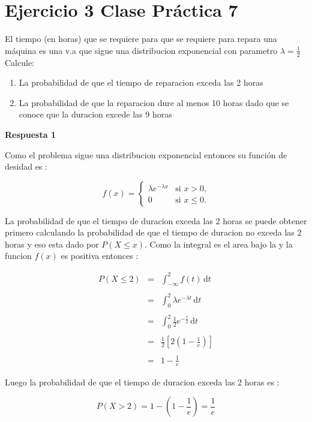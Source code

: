 \documentclass{article}
\begin{document}
            




    \section*{Ejercicio 3 Clase Pr\'actica 7}

    El tiempo (en horas) que se requiere para que se requiere para repara una m\'aquina es una v.a 
    que sigue una distribucion exponencial con parametro $ \lambda = \frac{1}{2} $ Calcule: 
    \begin{enumerate}
        \item La probabilidad de que el tiempo de reparacion exceda las 2 horas 
        \item La probabilidad de que la reparacion dure al menos 10 horas dado que se conoce que
         la duracion excede las 9 horas 
    \end{enumerate} 
    
    {\bf Respuesta 1 } 

    Como el problema sigue una distribucion exponencial entonces su funci\'on de desidad es : 

    
    \begin{equation*}
        f(x)=\begin{cases}
            \lambda e^{-\lambda x }  & \mbox{si $x>0$,}
            \\
            0                        & \mbox{si $x\le 0$.}
            \end{cases}
    \end{equation*}

    La probabilidad de que el tiempo de duracion exceda las 2 horas se 
    puede obtener primero calculando la probabilidad de que el tiempo de 
    duracion no exceda las 2 horas  y eso esta dado por $P \left(X \le x\right)$. 
    Como la integral es el area bajo la y la funcion $f\left(x\right) $ es positiva 
    entonces : 
    


    \begin{equation*}
        \begin{matrix}
            P \left(X \le 2 \right) & = & \int_{ - \infty   }^{2}  f\left(t\right)\,\mathrm{d}t
            \\\\
                                    & = & \int_{0 }^{2}  \lambda e^{- \lambda t}\,\mathrm{d}t
            \\\\
                                    & = & \int_{0 }^{2}  \frac{1}{2} e^{- \frac{t}{2} }\,\mathrm{d}t
            \\\\
                                    & = & \frac{1}{2} \left[2 \left(1-\frac{1}{e}\right)\right]
            \\\\
                                    & = & 1 - \frac{1}{e}
        \end{matrix}
    \end{equation*}
    

    Luego la probabilidad de que el tiempo de duracion exceda las 2 horas es : 

    \begin{equation*}
        P \left(X > 2 \right) = 1 - \left(1 - \frac{1}{e}\right)  = \frac{1}{e} 
    \end{equation*}
\end{document}

